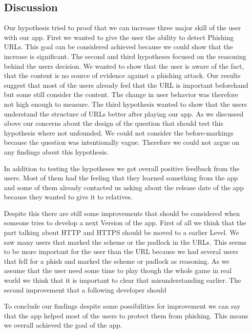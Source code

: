 \subsection{Discussion}
Our hypothesis tried to proof that we can increase three major skill of the user with our app.
First we wanted to give the user the ability to detect Phishing URLs.
This goal can be considered achieved because we could show that the increase is significant.
The second and third hypotheses focused on the reasoning behind the users decision.
We wanted to show that the user is aware of the fact, that the content is no source of evidence against a phishing attack.
Our results suggest that most of the users already feel that the URL is important beforehand but some still consider the content.
The change in user behavior was therefore not high enough to measure. 
The third hypothesis wanted to show that the users understand the structure of URLs better after playing our app.
As we discussed above our concerns about the design of the question that should test this hypothesis where not unfounded.
We could not consider the before-markings because the question was intentionally vague. Therefore we could not argue on any findings about this hypothesis.

In addition to testing the hypotheses we got overall positive feedback from the users.
Most of them had the feeling that they learned something from the app and some of them already contacted us asking about the release date of the app because they wanted to give it to relatives.

Despite this there are still some improvements that should be considered when someone tries to develop a next Version of the app.
First of all we think that the part talking about HTTP and HTTPS should be moved to a earlier Level.
We saw many users that marked the scheme or the padlock in the URLs.
This seems to be more important for the user than the URL because we had several users that fell for a phish and marked the scheme or padlock as reasoning.
As we assume that the user need some time to play though the whole game in real world we think that it is important to clear that misunderstanding earlier.
The second improvement that a following developer should 
%

To conclude our findings despite some possibilities for improvement we can say that the app helped most of the users to protect them from phishing. This means we overall achieved the goal of the app.

